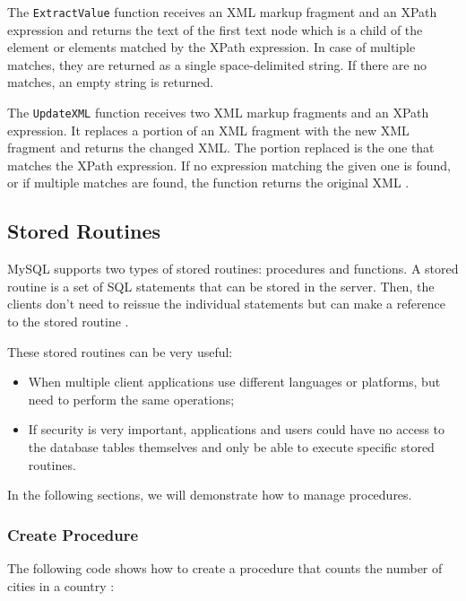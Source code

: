 \documentclass[12pt]{article}
\begin{document}
The \verb|ExtractValue| function receives an XML markup fragment and an XPath expression and returns the text of the first text node which is a child of the element or elements matched by the XPath expression. In case of multiple matches, they are returned as a single space-delimited string. If there are no matches, an empty string is returned.

\vspace{0.3cm}

The \verb|UpdateXML| function receives two XML markup fragments and an XPath expression. It replaces a portion of an XML fragment with the new XML fragment and returns the changed XML. The portion replaced is the one that matches the XPath expression. If no expression matching the given one is found, or if multiple matches are found, the function returns the original XML \parencite{XMLFunctions}.
 


\subsection{Stored Routines}
\label{procedures}
MySQL supports two types of stored routines: procedures and functions. A stored routine is a set of SQL statements that can be stored in the server. Then, the clients don't need to reissue the individual statements but can make a reference to the stored routine \parencite{storedRoutines}.

These stored routines can be very useful:
\begin{itemize}
    \item When multiple client applications use different languages or platforms, but need to perform the same operations;
    
    \item If security is very important, applications and users could have no access to the database tables themselves and only be able to execute specific stored routines.
    
\end{itemize}

\noindent In the following sections, we will demonstrate how to manage procedures.

\subsubsection{Create Procedure}
\label{createProcedure}
The following code shows how to create a procedure that counts the number of cities in a country \parencite{createProcedure}:
\end{document}
